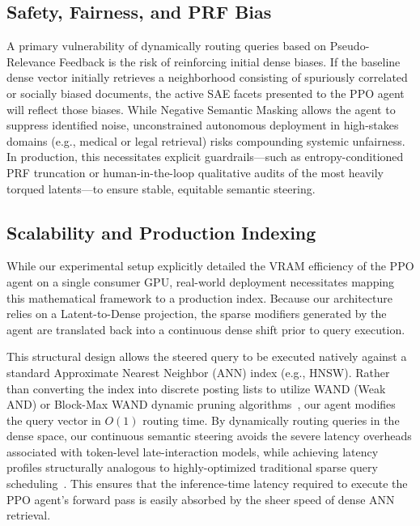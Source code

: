 \subsection{Safety, Fairness, and PRF Bias}
A primary vulnerability of dynamically routing queries based on Pseudo-Relevance Feedback is the risk of reinforcing initial dense biases. If the baseline dense vector initially retrieves a neighborhood consisting of spuriously correlated or socially biased documents, the active SAE facets presented to the PPO agent will reflect those biases. While Negative Semantic Masking allows the agent to suppress identified noise, unconstrained autonomous deployment in high-stakes domains (e.g., medical or legal retrieval) risks compounding systemic unfairness. In production, this necessitates explicit guardrails—such as entropy-conditioned PRF truncation or human-in-the-loop qualitative audits of the most heavily torqued latents—to ensure stable, equitable semantic steering.

\subsection{Scalability and Production Indexing}
While our experimental setup explicitly detailed the VRAM efficiency of the PPO agent on a single consumer GPU, real-world deployment necessitates mapping this mathematical framework to a production index. Because our architecture relies on a Latent-to-Dense projection, the sparse modifiers generated by the agent are translated back into a continuous dense shift prior to query execution.

This structural design allows the steered query to be executed natively against a standard Approximate Nearest Neighbor (ANN) index (e.g., HNSW). Rather than converting the index into discrete posting lists to utilize WAND (Weak AND) or Block-Max WAND dynamic pruning algorithms~\citep{broder2003}, our agent modifies the query vector in $O(1)$ routing time. By dynamically routing queries in the dense space, our continuous semantic steering avoids the severe latency overheads associated with token-level late-interaction models, while achieving latency profiles structurally analogous to highly-optimized traditional sparse query scheduling~\citep{macdonald2012}. This ensures that the inference-time latency required to execute the PPO agent's forward pass is easily absorbed by the sheer speed of dense ANN retrieval.

